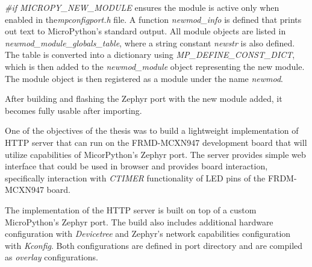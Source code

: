 \documentclass[twoside, 12pt]{article}
\begin{document}
\textit{\#if MICROPY\_NEW\_MODULE} ensures the module is active only when enabled in 
the\textit{mpconfigport.h} file. A function \textit{newmod\_info} is defined that prints out
text to MicroPython's standard output. All module objects are listed in 
\textit{newmod\_module\_globals\_table}, where a string constant 
\textit{newstr} is also defined. The table is converted into a dictionary using 
\textit{MP\_DEFINE\_CONST\_DICT}, which is then added to the \textit{newmod\_module} object 
representing the new module. The module object is then registered as a module under the name 
\textit{newmod}.\cite{mpy_new_module}

After building and flashing the Zephyr port with the new module added, it becomes fully usable after importing.

One of the objectives of the thesis was to build a lightweight implementation of HTTP server 
that can run on the FRMD-MCXN947 development board that will utilize capabilities of 
MicorPython's Zephyr port. The server provides simple web interface that could be used in 
browser and provides board interaction, specifically interaction with \textit{CTIMER} 
functionality of LED pins of the FRDM-MCXN947 board.

The implementation of the HTTP server is built on top of a custom MicroPython's Zephyr port. 
The build also includes additional hardware configuration with \textit{Devicetree} and 
Zephyr's network capabilities configuration with \textit{Kconfig}. Both configurations are 
defined in port directory and are compiled as \textit{overlay} configurations. 
\end{document}
